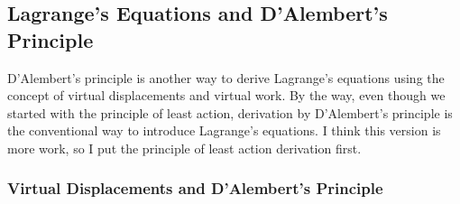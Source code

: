 \documentclass[11pt, a4paper]{article}
\begin{document}
\begin{itemize}
\end{itemize}

\subsection{Lagrange's Equations and D'Alembert's Principle}
D'Alembert's principle is another way to derive Lagrange's equations using the concept of virtual displacements and virtual work. By the way, even though we started with the principle of least action, derivation by D'Alembert's principle is the conventional way to introduce Lagrange's equations. I think this version is more work, so I put the principle of least action derivation first.

\subsubsection{Virtual Displacements and D'Alembert's Principle}
\end{document}
